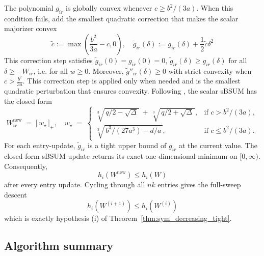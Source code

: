 \documentclass{article}
\begin{document}
The polynomial $g_{ir}$ is globally convex whenever $c \geq b^2/(3a)$. When this condition fails,\citet{Shi2017} add the smallest quadratic correction that makes the scalar majorizer convex
\begin{equation}
\widetilde{c} := \max\left( \frac{b^2}{3a} - c, 0\right), \quad \widetilde{g}_{ir}(\delta) := g_{ir}(\delta) + \frac{1}{2} \widetilde{c}\delta^2
\end{equation}
This correction step satisfies 
$\widetilde{g}_{ir}(0) = g_{ir}(0) = 0$, $\widetilde{g}_{ir}(\delta) \geq g_{ir}(\delta)$ for all $\delta \geq -W_{ir}$, i.e. for all $w \geq 0$. 
Moreover, $\widetilde{g}''_{ir}(\delta) \geq 0$ with strict convexity when $c > \frac{b^2}{3a}$. This correction step is applied only when needed and is the smallest quadratic perturbation that ensures convexity. Following \citet{Shi2017}, the scalar sBSUM has the closed form
\begin{equation}
W_{ir}^{\text{new}} \;=\; \bigl[\,w_\star\,\bigr]_+, \quad w_\star \;=\;
\begin{cases}
\sqrt[3]{\,q/2 - \sqrt{\Delta}\,}\, +\, \sqrt[3]{\,q/2 + \sqrt{\Delta}\,},
& \text{if } c > b^2/(3a),\\[6pt]
\sqrt[3]{\,b^3/(27 a^3) - d/a\,},
& \text{if } c \leq b^2/(3a).
\end{cases}
\end{equation}
For each entry-update, $\widetilde{g}_{ir}$ is a tight upper bound of $g_{ir}$ at the current value. The closed-form sBSUM update returns its exact one-dimensional minimum on $[0, \infty)$. Consequently,
\[
h_i(W^{\text{new}}) \leq h_i(W)
\]
after every entry update. Cycling through all $nk$ entries gives the full-sweep descent
\[
h_i(W^{(i+1)}) \leq h_i(W^{(i)})
\]
which is exactly hypothesis (i) of Theorem~\ref{thm:sym_decreasing_tight}.


\subsection{Algorithm summary}
\end{document}
